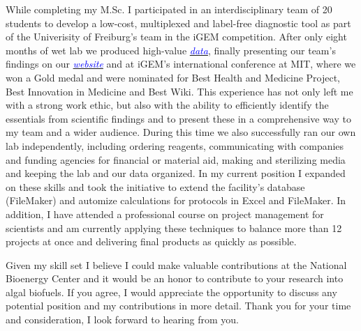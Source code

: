 \documentclass[11pt,a4paper,sans]{moderncv}
\begin{document}
\begin{spacing}{1.15}
While completing my M.Sc. I participated in an interdisciplinary team of 20 students to develop a low-cost, multiplexed and label-free diagnostic tool as part of the Univerisity of Freiburg's team in the iGEM competition.
After only eight months of wet lab we produced high-value  {\href{https://www.ncbi.nlm.nih.gov/pubmed/29803867}{\textcolor{blue}{\textit{data}}}}, finally presenting our team's findings on our {\href{http://2015.igem.org/Team:Freiburg}{\textcolor{blue}{\textit{website}}}} and at iGEM's international conference at MIT, where we won a Gold medal and were nominated for Best Health and Medicine Project, Best Innovation in Medicine and Best Wiki.
This experience has not only left me with a strong work ethic, but also with the ability to efficiently identify the essentials from scientific findings and to present these in a comprehensive way to my team and a wider audience.%
During this time we also successfully ran our own lab independently, including ordering reagents, communicating with companies and funding agencies for financial or material aid, making and sterilizing media and keeping the lab and our data organized. 
In my current position I expanded on these skills and took the initiative to extend the facility's database (FileMaker) and automize calculations for protocols in Excel and FileMaker. %
In addition, I have attended a professional course on project management for scientists and am currently applying these techniques to balance more than 12  projects at once and delivering final products as quickly as possible.
\par

Given my skill set I believe I could make valuable contributions at the National Bioenergy Center and it would be an honor to contribute to your research into algal biofuels. 
If you agree, I would appreciate the opportunity to discuss any potential position and my contributions in more detail. 
Thank you for your time and consideration, I look forward to hearing from you.


 

\end{spacing}
\makeletterclosing
\end{document}
